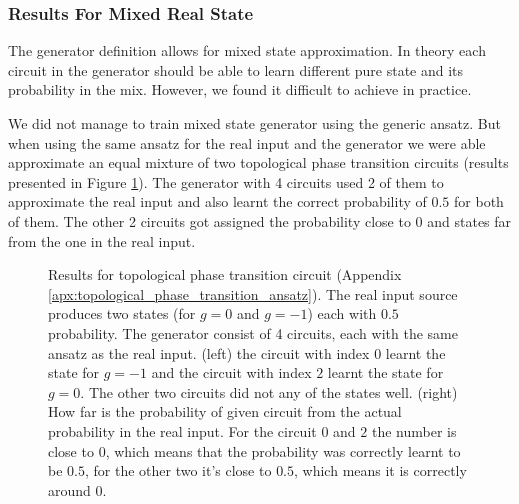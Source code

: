 \subsubsection{Results For Mixed Real State}
The generator definition allows for mixed state approximation. In theory each
circuit in the generator should be able to learn different pure state and its
probability in the mix. However, we found it difficult to achieve in practice.

We did not manage to train mixed state generator using the generic ansatz. But
when using the same ansatz for the real input and the generator we were able
approximate an equal mixture of two topological phase transition circuits (results
presented in Figure \ref{fig:wqgans_grid_phase_1}). The generator with 4 circuits
used 2 of them to approximate the real input and also learnt the correct
probability of $0.5$ for both of them. The other 2 circuits got assigned the
probability close to $0$ and states far from the one in the real input.

\begin{figure}[htbp!]
  \captionsetup[subfigure]{labelformat=empty}
  \centering
  \label{fig:wqgans_grid_phase_1}
  \caption{Results for topological phase transition circuit (Appendix
    \ref{apx:topological_phase_transition_ansatz}). The real input source
    produces two states (for $g=0$ and $g=-1$) each with $0.5$ probability.
    The generator consist of 4 circuits, each with the same ansatz as the real
    input. (left) the circuit with index $0$ learnt the state for $g=-1$ and the
    circuit with index $2$ learnt the state for $g=0$. The other two circuits
    did not any of the states well. (right) How far is the probability of given
    circuit from the actual probability in the real input. For the circuit $0$
    and $2$ the number is close to $0$, which means that the probability was
    correctly learnt to be $0.5$, for the other two it's close to $0.5$, which
    means it is correctly around $0$.
  }
\end{figure}

